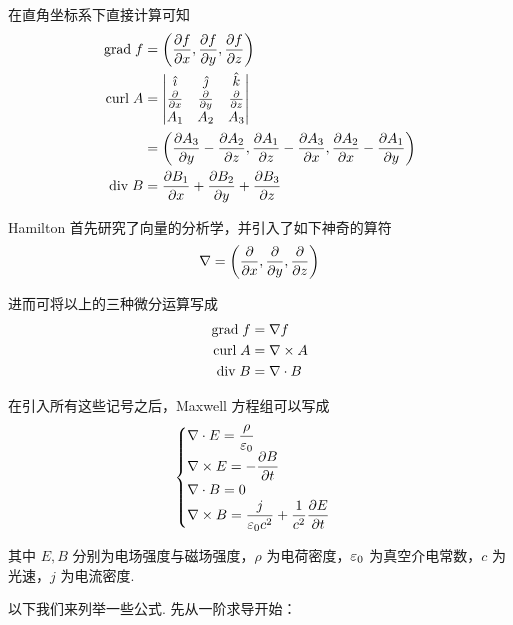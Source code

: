 在直角坐标系下直接计算可知
$$
\begin{aligned}
    \mathrm{grad}\; f&=\left(\frac{\partial{f}}{\partial{x}},\frac{\partial{f}}{\partial{y}},\frac{\partial{f}}{\partial{z}}\right)\\
    \mathrm{curl}\; A&=\begin{vmatrix}
        \hat{\imath} & \hat{\jmath} & \hat{k}\\
        \frac{\partial{}}{\partial{x}} & \frac{\partial{}}{\partial{y}} & \frac{\partial{}}{\partial{z}}\\
        A_1 & A_2 & A_3
    \end{vmatrix}\\
    &=\left(\frac{\partial{A_3}}{\partial{y}}-\frac{\partial{A_2}}{\partial{z}},\frac{\partial{A_1}}{\partial{z}}-\frac{\partial{A_3}}{\partial{x}},\frac{\partial{A_2}}{\partial{x}}-\frac{\partial{A_1}}{\partial{y}}\right)\\
    \mathrm{div}\; B&=\frac{\partial{B_1}}{\partial{x}}+\frac{\partial{B_2}}{\partial{y}}+\frac{\partial{B_3}}{\partial{z}}
\end{aligned}
$$

Hamilton 首先研究了向量的分析学，并引入了如下神奇的算符
$$
\nabla=\left(\frac{\partial{}}{\partial{x}},\frac{\partial{}}{\partial{y}},\frac{\partial{}}{\partial{z}}\right)
$$

进而可将以上的三种微分运算写成
$$
\begin{aligned}
    \mathrm{grad}\; f&=\nabla f\\
    \mathrm{curl}\; A&=\nabla\times A\\
    \mathrm{div}\; B&=\nabla\cdot B
\end{aligned}
$$

在引入所有这些记号之后，Maxwell 方程组可以写成
$$
\begin{cases}
    \displaystyle\nabla\cdot E=\frac{\rho}{\varepsilon_0}\\
    \displaystyle\nabla\times E=-\frac{\partial{B}}{\partial{t}}\\
    \displaystyle\nabla\cdot B=0\\
    \displaystyle\nabla\times B=\frac{j}{\varepsilon_0c^2}+\frac{1}{c^2}\frac{\partial{E}}{\partial{t}}
\end{cases}
$$

其中 $E,B$ 分别为电场强度与磁场强度，$\rho$ 为电荷密度，$\varepsilon_0$ 为真空介电常数，$c$ 为光速，$j$ 为电流密度.


以下我们来列举一些公式. 先从一阶求导开始：

